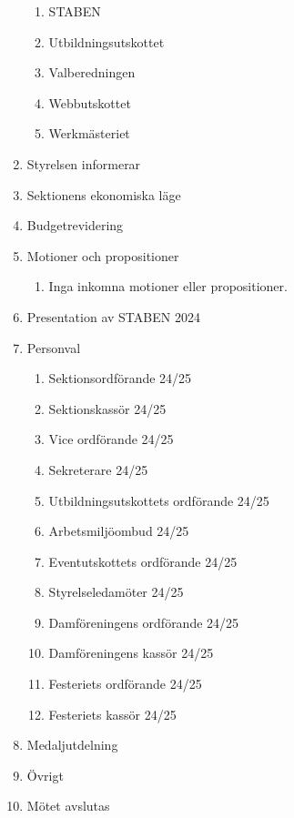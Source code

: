 \documentclass{datateknologsektionen-document}
\begin{document}
\begin{enumerate}[topsep=0pt,itemsep=1ex]
\begin{enumerate}[label*=\arabic*.,leftmargin=3em]
          \item STABEN
          \item Utbildningsutskottet
          \item Valberedningen
          \item Webbutskottet
          \item Werkmästeriet
        \end{enumerate}
  \item Styrelsen informerar
  \item Sektionens ekonomiska läge
  \item Budgetrevidering
  \item Motioner och propositioner
        \begin{enumerate}[label*=\arabic*.,leftmargin=3em]
          \item Inga inkomna motioner eller propositioner.
        \end{enumerate}
  \item Presentation av STABEN 2024
  \item Personval
        \begin{enumerate}[label*=\arabic*.,leftmargin=3em]
          \item Sektionsordförande 24/25
          \item Sektionskassör 24/25
          \item Vice ordförande 24/25
          \item Sekreterare 24/25
          \item Utbildningsutskottets ordförande 24/25
          \item Arbetsmiljöombud 24/25
          \item Eventutskottets ordförande 24/25
          \item Styrelseledamöter 24/25
          \item Damföreningens ordförande 24/25
          \item Damföreningens kassör 24/25
          \item Festeriets ordförande 24/25
          \item Festeriets kassör 24/25
        \end{enumerate}
  \item Medaljutdelning
  \item Övrigt
  \item Mötet avslutas
\end{enumerate}
\end{document}
